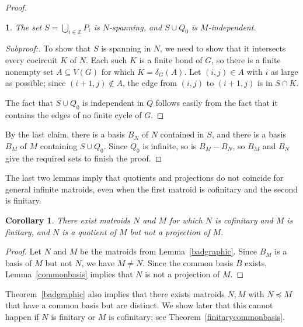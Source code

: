 \documentclass{amsart}
\theoremstyle{plain}
\newtheorem{claim}{}[theorem]
\newtheorem{corollary}[theorem]{Corollary}
\theoremstyle{definition}
\newcommand{\bZ}{\mathbb Z}
\renewcommand{\ss}{\subseteq}
\newenvironment{subproof}[1][\proofname]{%
  \renewcommand{\qedsymbol}{$\blacksquare$}%
  \begin{proof}[Subproof:]%
}{%
  \end{proof}%
}
\begin{document}
\begin{proof}
  \begin{claim}
    The set $S = \bigcup_{i \in \bZ} P_i$ is $N$-spanning, and $S \cup Q_0$ is $M$-independent. 
  \end{claim}
  \begin{subproof}
    To show that $S$ is spanning in $N$, we need to show that it intersects every cocircuit $K$ of $N$. 
    Each such $K$ is a finite bond of $G$, so there is a finite nonempty set $A \ss V(G)$ for which $K = \delta_G(A)$.
    Let $(i,j) \in A$ with $i$ as large as possible; since $(i+1,j) \notin A$, the edge from $(i,j)$ to $(i+1,j)$ is in $S \cap K$.

    The fact that $S \cup Q_0$ is independent in $Q$ follows easily from the fact that it contains the edges of no finite cycle of $G$. 
  \end{subproof}

  By the last claim, there is a basis $B_N$ of $N$ contained in $S$, and there is a basis $B_M$ of $M$ containing $S \cup Q_0$. 
  Since $Q_0$ is infinite, so is $B_M - B_N$, so $B_M$ and $B_N$ give the required sets to finish the proof. 
\end{proof}

The last two lemmas imply that quotients and projections do not coincide for general infinite matroids, 
even when the first matroid is cofinitary and the second is finitary. 

\begin{corollary}
  There exist matroids $N$ and $M$ for which $N$ is cofinitary and $M$ is finitary, and $N$ is a quotient of $M$ but not a projection of $M$. 
\end{corollary}
\begin{proof}
  Let $N$ and $M$ be the matroids from Lemma~\ref{badgraphic}. 
  Since $B_M$ is a basis of $M$ but not $N$, we have $M \ne N$. 
  Since the common basis $B$ exists,
  Lemma~\ref{commonbasis} implies that $N$ is not a projection of $M$. 
\end{proof}

Theorem~\ref{badgraphic} also implies that there exists matroids $N,M$ with $N \preceq M$ that have a common basis but are distinct. 
We show later that this cannot happen if $N$ is finitary or $M$ is cofinitary; see Theorem~\ref{finitarycommonbasis}. 
\end{document}

